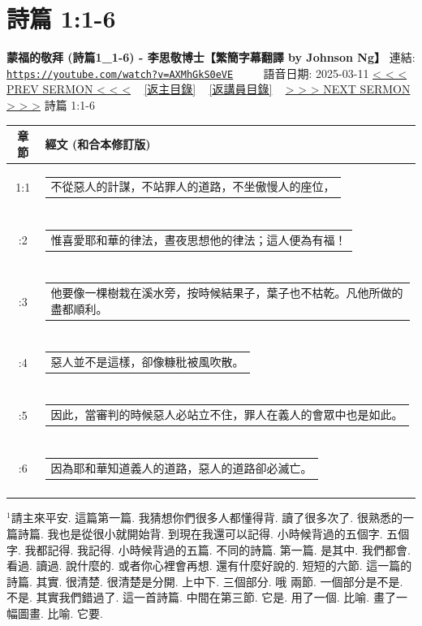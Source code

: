 \documentclass{book}
\begin{document}
\section{詩篇 1:1-6}
\label{sec:AXMhGkS0eVE}
\textbf{蒙福的敬拜 (詩篇1\_1-6) - 李思敬博士【繁簡字幕翻譯 by Johnson Ng】}
\newline
\newline
連結: \href{https://youtube.com/watch?v=AXMhGkS0eVE}{\texttt{https://youtube.com/watch?v=AXMhGkS0eVE}} ~~~~ 語音日期: 2025-03-11
\newline
\newline
\hyperref[sec:YdX9gstJs1g]{< < < PREV SERMON < < <}
~
\hyperlink{toc}{[返主目錄]}
~
\hyperref[ch:preacher5]{[返講員目錄]}
~
\hyperref[sec:l8BFPdIOADs]{> > > NEXT SERMON > > >}
\newline
\newline
詩篇 1:1-6
\newline
\begin{longtable}{cl}
\hline
\hline
章節 & 經文 (和合本修訂版)\\
\hline
1:1 & \begin{tabularx}{0.7\textwidth}{X} 不從惡人的計謀，不站罪人的道路，不坐傲慢人的座位， \end{tabularx} \\ \\ \relax
1:2 & \begin{tabularx}{0.7\textwidth}{X} 惟喜愛耶和華的律法，晝夜思想他的律法；這人便為有福！ \end{tabularx} \\ \\ \relax
1:3 & \begin{tabularx}{0.7\textwidth}{X} 他要像一棵樹栽在溪水旁，按時候結果子，葉子也不枯乾。凡他所做的盡都順利。 \end{tabularx} \\ \\ \relax
1:4 & \begin{tabularx}{0.7\textwidth}{X} 惡人並不是這樣，卻像糠秕被風吹散。 \end{tabularx} \\ \\ \relax
1:5 & \begin{tabularx}{0.7\textwidth}{X} 因此，當審判的時候惡人必站立不住，罪人在義人的會眾中也是如此。 \end{tabularx} \\ \\ \relax
1:6 & \begin{tabularx}{0.7\textwidth}{X} 因為耶和華知道義人的道路，惡人的道路卻必滅亡。 \end{tabularx} \\ \\
[1ex]
\hline
\hline
\end{longtable}
$^{1}$請主來平安.
這篇第一篇.
我猜想你們很多人都懂得背.
讀了很多次了.
很熟悉的一篇詩篇.
我也是從很小就開始背.
到現在我還可以記得.
小時候背過的五個字.
五個字.
我都記得.
我記得.
小時候背過的五篇.
不同的詩篇.
第一篇.
是其中.
我們都會.
看過.
讀過.
說什麼的.
或者你心裡會再想.
還有什麼好說的.
短短的六節.
這一篇的詩篇.
其實.
很清楚.
很清楚是分開.
上中下.
三個部分.
哦 兩節.
一個部分是不是.
不是.
其實我們錯過了.
這一首詩篇.
中間在第三節.
它是.
用了一個.
比喻.
畫了一幅圖畫.
比喻.
它要.
\end{document}
